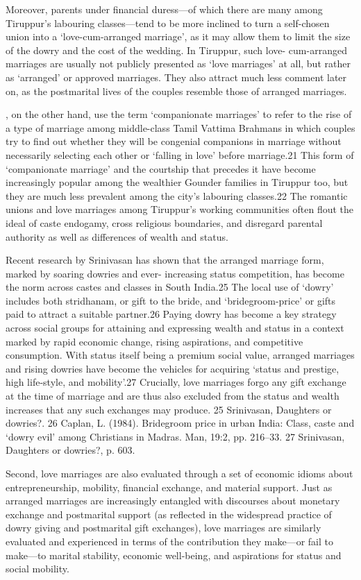 \documentclass[a4paper, 11pt, onecolumn]{article}
\begin{document}
Moreover, parents
under financial duress—of which there are many among Tiruppur’s
labouring classes—tend to be more inclined to turn a self-chosen union
into a ‘love-cum-arranged marriage’, as it may allow them to limit the
size of the dowry and the cost of the wedding. In Tiruppur, such love-
cum-arranged marriages are usually not publicly presented as ‘love
marriages’ at all, but rather as ‘arranged’ or approved marriages.
They also attract much less comment later on, as the postmarital
lives of the couples resemble those of arranged marriages.

\cite{Fuller2008}, on the other hand, use the term
‘companionate marriages’ to refer to the rise of a type of marriage
among middle-class Tamil Vattima Brahmans in which couples try
to find out whether they will be congenial companions in marriage
without necessarily selecting each other or ‘falling in love’ before
marriage.21 This form of ‘companionate marriage’ and the courtship
that precedes it have become increasingly popular among the
wealthier Gounder families in Tiruppur too, but they are much less
prevalent among the city’s labouring classes.22 The romantic unions
and love marriages among Tiruppur’s working communities often flout
the ideal of caste endogamy, cross religious boundaries, and disregard
parental authority as well as differences of wealth and status.

Recent research by Srinivasan has shown that
the arranged marriage form, marked by soaring dowries and ever-
increasing status competition, has become the norm across castes
and classes in South India.25 The local use of ‘dowry’ includes both
stridhanam, or gift to the bride, and ‘bridegroom-price’ or gifts paid to
attract a suitable partner.26 Paying dowry has become a key strategy
across social groups for attaining and expressing wealth and status
in a context marked by rapid economic change, rising aspirations,
and competitive consumption. With status itself being a premium
social value, arranged marriages and rising dowries have become
the vehicles for acquiring ‘status and prestige, high life-style, and
mobility’.27 Crucially, love marriages forgo any gift exchange at the
time of marriage and are thus also excluded from the status and wealth
increases that any such exchanges may produce.
25 Srinivasan, Daughters or dowries?.
26 Caplan, L. (1984). Bridegroom price in urban India: Class, caste and ‘dowry evil’
among Christians in Madras. Man, 19:2, pp. 216–33.
27 Srinivasan, Daughters or dowries?, p. 603.

Second, love marriages are also evaluated through a set of economic
idioms about entrepreneurship, mobility, financial exchange, and
material support. Just as arranged marriages are increasingly
entangled with discourses about monetary exchange and postmarital
support (as reflected in the widespread practice of dowry giving and
postmarital gift exchanges), love marriages are similarly evaluated
and experienced in terms of the contribution they make—or fail to
make—to marital stability, economic well-being, and aspirations for
status and social mobility. 
\end{document}
